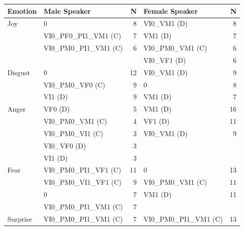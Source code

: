 \documentclass[output=paper]{langsci/langscibook}
\begin{document}
\begin{table}[p]
\begin{tabular}{llrlr}
\lsptoprule
Emotion  & Male Speaker           & N & Female Speaker          & N \\
\midrule
Joy      & 0                      & 8               & VI0\_VM1 (D)            & 8               \\
         & VI0\_PF0\_PI1\_VM1 (C) & 7               & VM1 (D)                 & 7               \\
         & VI0\_PM0\_PI1\_VM1 (C) & 6               & VI0\_PM0\_VM1 (C)       & 6               \\
         &                        &                 & VI0\_VF1 (D)            & 6               \\
\midrule
Disgust  & 0                      & 12              & VI0\_VM1 (D)            & 9               \\
         & VI0\_PM0\_VF0 (C)      & 9               & 0                       & 8               \\
         & VI1 (D)                & 9               & VM1 (D)                 & 7               \\
\midrule
Anger    & VF0 (D)                & 5               & VM1 (D)                 & 16              \\
         & VI0\_PM0\_VM1 (C)      & 4               & VF1 (D)                 & 11              \\
         & VI0\_PM0\_VI1 (C)      & 3               & VI0\_VM1 (D)            & 9               \\
         & VI0\_VF0 (D)           & 3               &                         &                 \\
         & VI1 (D)                & 3               &                         &                 \\
\midrule
Fear     & VI0\_PM0\_PI1\_VF1 (C) & 11              & 0                       & 13              \\
         & VI0\_PM0\_VI1\_VF1 (C) & 9               & VI0\_PM0\_VM1 (C)       & 11              \\
         & 0                      & 7               & VM1 (D)                 & 11              \\
         & VI0\_PM0\_PI1\_VM1 (C) & 7               &                         &                 \\
\midrule
Surprise & VI0\_PM0\_PI1\_VM1 (C) & 7               & VI0\_PM0\_PI1\_VM1 (C)  & 13              \\

\end{tabular}
\end{table}
\end{document}
